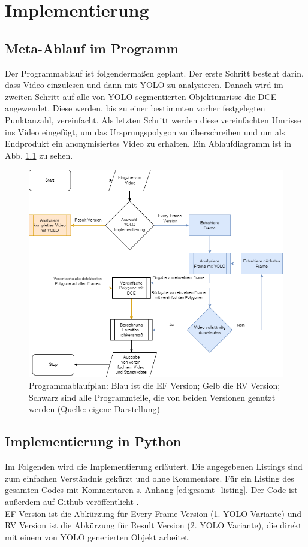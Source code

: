 \chapter{Implementierung} 
\label{ch:implementierung}
\section{Meta-Ablauf im Programm}{
	Der Programmablauf ist folgendermaßen geplant. Der erste Schritt besteht darin, dass Video einzulesen und dann mit YOLO zu analysieren. Danach wird im zweiten Schritt auf alle von YOLO segmentierten Objektumrisse die DCE angewendet. Diese werden, bis zu einer bestimmten vorher festgelegten Punktanzahl, vereinfacht. Als letzten Schritt werden diese vereinfachten Umrisse ins Video eingefügt, um das Ursprungspolygon zu überschreiben und um als Endprodukt ein anonymisiertes Video zu erhalten. Ein Ablaufdiagramm ist in Abb. \ref{pic:Programmablaufplan} zu sehen. \\
	
	
	\begin{figure}[h]
		\centering
		\includegraphics*[scale = 0.6, keepaspectratio]{images/Ablaufdiagram.png}
		\caption[Programmablaufplan]{Programmablaufplan: Blau ist die EF Version; Gelb die RV Version; Schwarz sind alle Programmteile, die von beiden Versionen genutzt werden (Quelle: eigene Darstellung)}
		\label{pic:Programmablaufplan}
	\end{figure}
	}

\section{Implementierung in Python} 
{\label{implementation_in_python}} 
Im Folgenden wird die Implementierung erläutert. Die angegebenen Listings sind zum einfachen Verständnis gekürzt und ohne Kommentare. Für ein Listing des gesamten Codes mit Kommentaren s. Anhang \ref{cd:gesamt_listing}. Der Code ist außerdem auf Github veröffentlicht \citep{Lietmeyer2023}.\\ 
EF Version ist die Abkürzung für \glqq Every Frame\grqq{} Version (1. YOLO Variante) und RV Version ist die Abkürzung für \glqq Result\grqq{} Version (2. YOLO Variante), die direkt mit einem von YOLO generierten Objekt arbeitet. 
